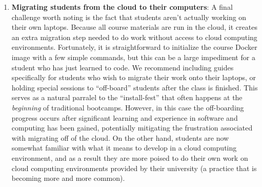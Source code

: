\begin{enumerate}
\item {\bf Migrating students from the cloud to their computers}: A final
challenge worth noting is the fact that students aren't actually working on
their own laptops. Because all course materials are run in the cloud, it creates
an extra migration step needed to do work without access to cloud computing
environments. Fortunately, it is straightforward to initialize the course Docker
image with a few simple commands, but this can be a large impediment for a
student who has just learned to code. We recommend including guides specifically
for students who wish to migrate their work onto their laptops, or holding
special sessions to ``off-board'' students after the class is finished. This
serves as a natural parralel to the ``install-fest'' that often happens at the
\emph{beginning} of traditional bootcamps. However, in this case the
off-boarding progress occurs after significant learning and experience in
software and computing has been gained, potentially mitigating the frustration
associated with migrating off of the cloud. On the other hand, students are now
somewhat familiar with what it means to develop in a cloud computing
environment, and as a result they are more poised to do their own work on cloud
computing environments provided by their university (a practice that is becoming
more and more common).

\end{enumerate}
